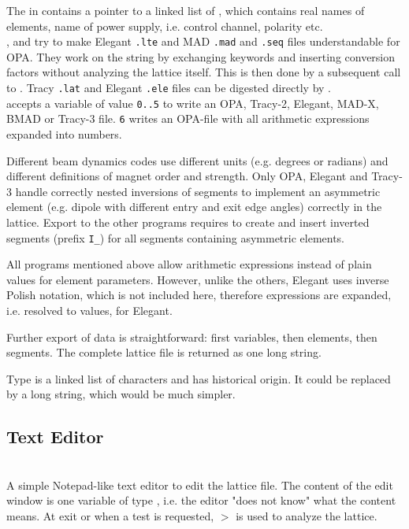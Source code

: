 \documentclass[12pt]{article}
\newcommand\code[1]{{\tt #1}}
\newcommand{\unico}[1]{{\color{burntorange}\code{#1}}}
\newcommand{\prcod}[2]{\opauni{#1}$>$\unico{#2}}
\newcommand{\opagui}[1]{\colorbox{blue!20}{{\color{black}\code{#1}}}}
\newcommand{\oguih}[2]{\subsection{\label{#2}#1}{\Huge\opagui{#2}}\\}
\newcommand{\opauni}[1]{\colorbox{orange!30}{{\color{black}\code{#1}}}}
\newcommand{\ouni}[1]{\hyperref[#1]{\opauni{#1}}}
\newcommand{\desc}[1]{#1}
\newcommand{\todo}[1]{{\color{red} #1}}
\begin{document}
{The \unico{ElementType} in \ouni{globlib} contains a pointer to a linked list of \unico{NameListType},  which contains real names of elements, name of power supply, i.e. control channel, polarity etc. \\


\unico{lteconvert}, \unico{madconvert} and \unico{madseqconvert} try to make Elegant \code{*.lte} and MAD \code{*.mad} and \code{*.seq} files understandable for OPA. They work on the \unico{TextBuffer} string by exchanging keywords and inserting conversion factors without analyzing the lattice itself. This is then done by a subsequent call to \unico{LatRead}. Tracy \code{*.lat} and Elegant \code{*.ele} files can be digested directly by \unico{LatRead}.\\

\unico{WriteLattice} accepts a variable \unico{mode} of value \code{0..5} to write an OPA, Tracy-2, Elegant, MAD-X, BMAD or Tracy-3 file. \unico{mode} \code{6} writes an OPA-file with all arithmetic expressions expanded into numbers.

Different beam dynamics codes use different units (e.g. degrees or radians) and different definitions of magnet order and strength. Only OPA, Elegant and Tracy-3 handle correctly nested inversions of segments to implement an asymmetric element (e.g. dipole with different entry and exit edge angles) correctly in the lattice. Export to the other programs requires to create and insert inverted segments (prefix \code{I\_}) for all segments containing asymmetric elements.

All  programs mentioned above allow arithmetic expressions instead of plain values for element parameters. However, unlike the others, Elegant uses inverse Polish notation, which is not included here, therefore expressions are expanded, i.e. resolved to values, for Elegant.

Further export of data is straightforward: first variables, then elements, then segments. The complete lattice file is returned as one long string.
}

\todo{Type \unico{TextBuffer} is a linked list of characters and has historical origin. It could be replaced by a long string, which would be much simpler.}

\oguih{Text Editor}{opatexteditor} 
\desc{A simple Notepad-like text editor to edit the lattice file. The content of the edit window is one variable of type \unico{textbuffer}, i.e. the editor "does not know" what the content means. At exit or when a test is requested, \prcod{latfilelib}{LatRead} is used to analyze the lattice.}
\end{document}
